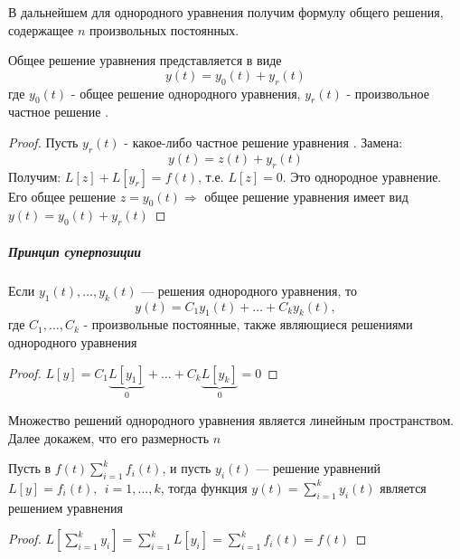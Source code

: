 В дальнейшем для однородного уравнения получим формулу общего решения, содержащее $n$ произвольных постоянных.
\begin{teo}
Общее решение уравнения  представляется в виде 
\begin{equation}
\label{five.four}
y(t) = y_0(t) + y_r(t)
\end{equation}
где $y_0(t)$ - общее решение однородного уравнения, $y_r(t)$ - произвольное частное решение .
\end{teo}
\begin{proof}
Пусть $y_r(t)$ - какое-либо частное решение уравнения . Замена:
\[ y(t) = z(t) + y_r(t) \]
Получим: $L[z] + L[y_r] = f(t)$, т.е. $L[z] = 0$. Это однородное уравнение. Его общее решение $z = y_0(t) \Rightarrow$ общее решение уравнения  имеет вид $y(t) = y_0(t) + y_r(t)$
\end{proof}
\subparagraph{Принцип суперпозиции}
\begin{lem}
Если $y_1(t), \ldots, y_k(t)$ --- решения однородного уравнения, то
\[ y(t) = C_1y_1(t) + \ldots + C_ky_k(t), \]
где $C_1, \ldots, C_k$ - произвольные постоянные, также являющиеся решениями однородного уравнения
\end{lem}
\begin{proof}
$L[y] = C_1\underbrace{L[y_1]}_0 + \ldots + C_k\underbrace{L[y_k]}_0 = 0$
\end{proof}

\begin{ntc}
Множество решений однородного уравнения является линейным пространством. Далее докажем, что его размерность $n$
\end{ntc}
\begin{lem}
Пусть в  $f(t) \sum\limits_{i = 1}^{k}f_i(t)$, и пусть $y_i(t)$ --- решение уравнений $L[y] = f_i(t),~~ i = 1, \ldots, k$, тогда функция $y(t) = \sum\limits_{i = 1}^{k}y_i(t)$ является решением уравнения 
\end{lem}
\begin{proof}
$L[\sum\limits_{i = 1}^k y_i] = \sum\limits_{i = 1}^kL[y_i] = \sum\limits_{i = 1}^k f_i(t) = f(t)$
\end{proof}